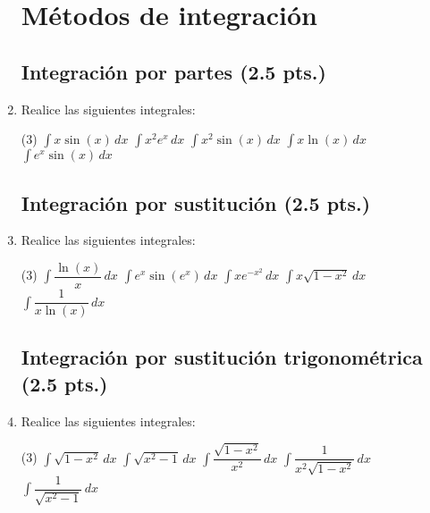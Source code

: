 \documentclass[letterpaper,11pt]{article}
\begin{document}
\begin{enumerate}



\section*{Métodos de integración}

\subsection*{Integración por partes (2.5 pts.)}
\item Realice las siguientes integrales:
\begin{tasks}(3)
\task $\displaystyle \int x \sin(x) \, dx$
\task $\displaystyle \int x^2 e^x \, dx$
\task $\displaystyle \int x^2 \sin(x) \, dx$
\task $\displaystyle \int x \ln(x) \, dx$
\task $\displaystyle \int e^{x} \sin(x) \, dx$
\end{tasks}

\subsection*{Integración por sustitución (2.5 pts.)}
\item  Realice las siguientes integrales:
\begin{tasks}(3)
\task $\displaystyle \int \dfrac{\ln(x)}{x} \, dx$
\task $\displaystyle \int e^x \sin(e^x) \, dx$
\task $\displaystyle \int xe^{-x^2} \, dx$
\task $\displaystyle \int x\sqrt{1- x^2} \, dx$
\task $\displaystyle \int \dfrac{1}{x \ln(x)} \, dx$
\end{tasks}

\subsection*{Integración por sustitución trigonométrica (2.5 pts.)}
\item  Realice las siguientes integrales:
\begin{tasks}(3)
\task $\displaystyle \int \sqrt{1 - x^2} \, dx$
\task $\displaystyle \int \sqrt{x^2 - 1} \, dx$
\task $\displaystyle \int \dfrac{\sqrt{1 - x^2}}{x^2} \, dx$
\task $\displaystyle \int  \dfrac{1}{x^2 \sqrt{1 - x^2}} \, dx$
\task $\displaystyle \int  \dfrac{1}{ \sqrt{x^2 - 1}} \, dx$
\end{tasks}


\end{enumerate}
\end{document}
